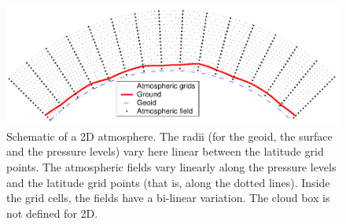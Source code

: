 \begin{figure}[!t]
 \begin{center}
  \includegraphics*[width=0.98\hsize]{atm_dim_2d}
  \caption{Schematic of a 2D atmosphere. The radii (for the geoid, the surface
    and the pressure levels) vary here linear between the latitude
    grid points. The atmospheric fields vary linearly along the
    pressure levels and the latitude grid points (that is, along the
    dotted lines). Inside the grid cells, the fields have a bi-linear
    variation. The cloud box is not defined for 2D.  }
  \label{fig:fm_defs:2d}
 \end{center}
\end{figure}

